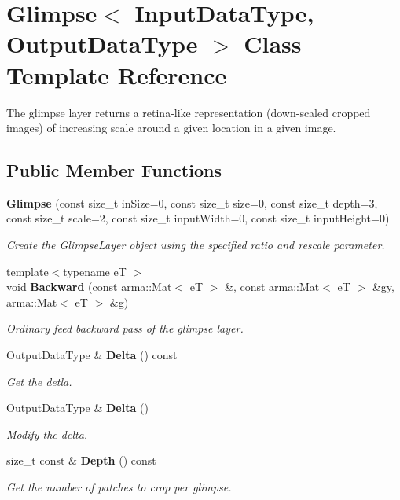 \section{Glimpse$<$ Input\+Data\+Type, Output\+Data\+Type $>$ Class Template Reference}
\label{classmlpack_1_1ann_1_1Glimpse}


The glimpse layer returns a retina-\/like representation (down-\/scaled cropped images) of increasing scale around a given location in a given image.  


\subsection*{Public Member Functions}
\begin{DoxyCompactItemize}
\item 
\textbf{ Glimpse} (const size\+\_\+t in\+Size=0, const size\+\_\+t size=0, const size\+\_\+t depth=3, const size\+\_\+t scale=2, const size\+\_\+t input\+Width=0, const size\+\_\+t input\+Height=0)
\begin{DoxyCompactList}\small\item\em Create the Glimpse\+Layer object using the specified ratio and rescale parameter. \end{DoxyCompactList}\item 
{\footnotesize template$<$typename eT $>$ }\\void \textbf{ Backward} (const arma\+::\+Mat$<$ eT $>$ \&, const arma\+::\+Mat$<$ eT $>$ \&gy, arma\+::\+Mat$<$ eT $>$ \&g)
\begin{DoxyCompactList}\small\item\em Ordinary feed backward pass of the glimpse layer. \end{DoxyCompactList}\item 
Output\+Data\+Type \& \textbf{ Delta} () const
\begin{DoxyCompactList}\small\item\em Get the detla. \end{DoxyCompactList}\item 
Output\+Data\+Type \& \textbf{ Delta} ()
\begin{DoxyCompactList}\small\item\em Modify the delta. \end{DoxyCompactList}\item 
size\+\_\+t const  \& \textbf{ Depth} () const
\begin{DoxyCompactList}\small\item\em Get the number of patches to crop per glimpse. \end{DoxyCompactList}\item 

\end{DoxyCompactItemize}
